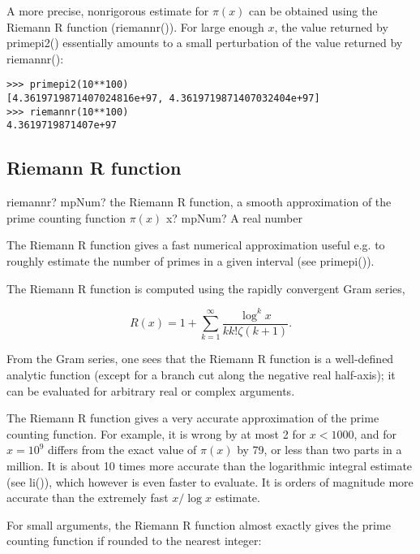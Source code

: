 A more precise, nonrigorous estimate for $\pi(x)$ can be obtained using the Riemann R function (riemannr()). For large enough $x$, the value returned by primepi2() essentially amounts to a small perturbation of the value returned by riemannr():

\begin{lstlisting}
>>> primepi2(10**100)
[4.3619719871407024816e+97, 4.3619719871407032404e+97]
>>> riemannr(10**100)
4.3619719871407e+97
\end{lstlisting}



\subsection{ Riemann R function}

\begin{mpFunctionsExtract}
	\mpFunctionOne
	{riemannr? mpNum? the Riemann R function, a smooth approximation of the prime counting function $\pi(x)$}
	{x? mpNum? A real number}	
\end{mpFunctionsExtract}

\vpara
The Riemann R function gives a fast numerical approximation useful e.g. to roughly estimate the number of primes in a given interval (see primepi()).

The Riemann R function is computed using the rapidly convergent Gram series,

\begin{equation}
R(x) = 1 + \sum_{k=1}^{\infty} \frac{\log^k x}{k k! \zeta(k+1)}.
\end{equation}

From the Gram series, one sees that the Riemann R function is a well-defined analytic function (except for a branch cut along the negative real half-axis); it can be evaluated for arbitrary real or complex arguments.

The Riemann R function gives a very accurate approximation of the prime counting function. For example, it is wrong by at most 2 for $x<1000$, and for $x=10^9$ differs from the exact value of $\pi(x)$ by 79, or less than two parts in a million. It is about 10 times more accurate than the logarithmic integral estimate (see li()), which however is even faster to evaluate. It is orders of magnitude more accurate than the extremely fast $x/\log x$ estimate.

\vpara
For small arguments, the Riemann R function almost exactly gives the prime counting function if rounded to the nearest integer:

